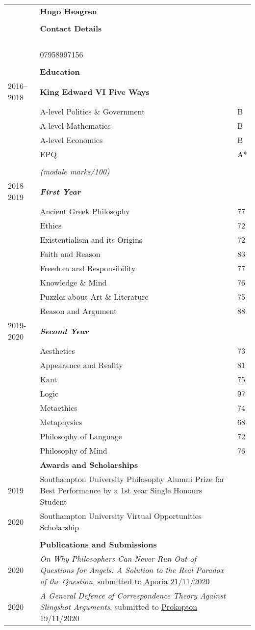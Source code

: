 \documentclass{article}
\makeatletter
\newcommand{\email}[1]{&%
    \IfEqCase{#1}{%
	    {personal}{\href{mailto:\personal}{\personal} \textit{(personal)}\\}
	    {academic}{\href{mailto:\academic}{\academic} \textit{(institution)}\\}
    }[\PackageError{email}{Undefined option to email: #1}{}]%
}
\renewcommand{\section}[1]{\\[-1.0ex]& \multicolumn{2}{l}{\bfseries{\Large{#1}}}\vspace{0.5ex}\\}
\newcommand{\entry}[3]{\scriptsize{\textsc{#1}} & #2 & #3 \\}
\newcommand{\pub}[3]{\entry{#1}{\textit{#2}, #3}{}}
\newcommand{\listentry}[3]{\entry{#1}{\bfseries{#2}}{#3} \\}
\newcommand{\listsub}[2]{\\ \scriptsize{#1} & \bfseries{\textit{#2}}&}
\newcommand{\etem}[2]{\\ & #1 & #2}
\renewcommand{\title}[1]{&\LARGE{\bfseries{#1}}&\\}
\newcommand{\academic}{hbh1g18@soton.ac.uk}
\newcommand{\personal}{hugo@heagen.com}
\newcommand{\phone}{&07958997156\\}
\makeatother
\begin{document}
\begin{tabularx}{\textwidth}{ p{6em} X p{6em} }
\title{Hugo Heagren}
\section{Contact Details}
\email{academic}
\email{personal}
\phone

\section{Education} 
\listentry{2016--2018}{King Edward VI Five Ways}{
                 \etem{A-level Politics \& Government}{B}
                 \etem{A-level Mathematics}           {B}
                 \etem{A-level Economics}             {B}
                 \etem{EPQ}                           {A*}
}                

\listentry{from 2018}{BA Philosophy, University of Southampton}{
\\ & \textit{(module marks/100)}\noindent &
	    \listsub{2018-2019}{First Year}
            \etem{Ancient Greek Philosophy}        {77}
            \etem{Ethics}                          {72}
            \etem{Existentialism and its Origins}  {72}
            \etem{Faith and Reason}                {83}
            \etem{Freedom and Responsibility}      {77}
            \etem{Knowledge \& Mind}               {76}
            \etem{Puzzles about Art \& Literature} {75}
            \etem{Reason and Argument}             {88}
	    \listsub{2019-2020}{Second Year}
            \etem{Aesthetics}                      {73}
            \etem{Appearance and Reality}          {81}
            \etem{Kant}                            {75}
            \etem{Logic}                           {97}
            \etem{Metaethics}                      {74}
            \etem{Metaphysics}                     {68}
            \etem{Philosophy of Language}          {72}
            \etem{Philosophy of Mind}              {76}
}
\section{Awards and Scholarships}
\entry{2019}{Southampton University Philosophy Alumni Prize for Best Performance by a 1st year Single Honours Student}{}
\entry{2020}{Southampton University Virtual Opportunities Scholarship}{}

\section{Publications and Submissions}
\pub{2020}{On Why Philosophers Can Never Run Out of Questions for Angels: A Solution to the Real Paradox of the Question}{submitted to \href{https://ojs.st-andrews.ac.uk/index.php/aporia/index}{Aporia} 21/11/2020}
\pub{2020}{A General Defence of Correspondence Theory Against Slingshot Arguments}{submitted to \href{https://prokopton.bilkent.edu.tr/}{Prokopton} 19/11/2020}


\end{tabularx}
\end{document}
